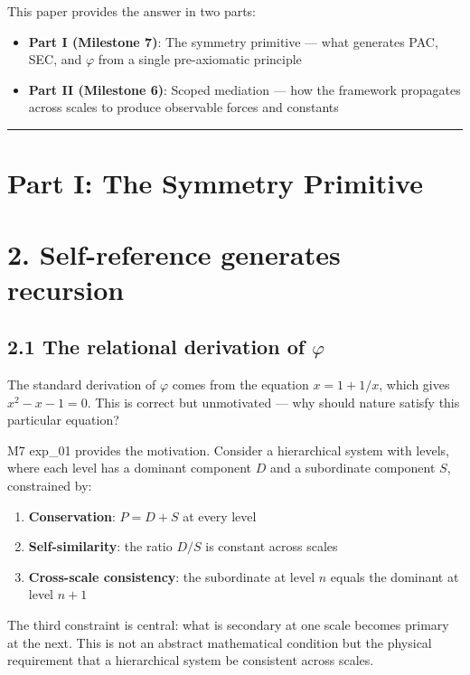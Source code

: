 \documentclass[11pt,a4paper]{article}
\providecommand{\tightlist}{\setlength{\itemsep}{0pt}\setlength{\parskip}{0pt}}
\begin{document}
This paper provides the answer in two parts:
\begin{itemize}\tightlist
\item \textbf{Part I (Milestone 7)}: The symmetry primitive — what generates PAC, SEC, and $\varphi$ from a single pre-axiomatic principle
\item \textbf{Part II (Milestone 6)}: Scoped mediation — how the framework propagates across scales to produce observable forces and constants
\end{itemize}

\begin{center}\rule{0.5\linewidth}{0.4pt}\end{center}

\section*{Part I: The Symmetry Primitive}

\section*{2. Self-reference generates recursion}

\subsection*{2.1 The relational derivation of $\varphi$}

The standard derivation of $\varphi$ comes from the equation $x = 1 + 1/x$, which gives $x^2 - x - 1 = 0$. This is correct but unmotivated — why should nature satisfy this particular equation?

M7 exp\_01 provides the motivation. Consider a hierarchical system with levels, where each level has a dominant component $D$ and a subordinate component $S$, constrained by:
\begin{enumerate}\tightlist
\item \textbf{Conservation}: $P = D + S$ at every level
\item \textbf{Self-similarity}: the ratio $D/S$ is constant across scales
\item \textbf{Cross-scale consistency}: the subordinate at level $n$ equals the dominant at level $n+1$
\end{enumerate}

The third constraint is central: what is secondary at one scale becomes primary at the next. This is not an abstract mathematical condition but the physical requirement that a hierarchical system be consistent across scales.
\end{document}
